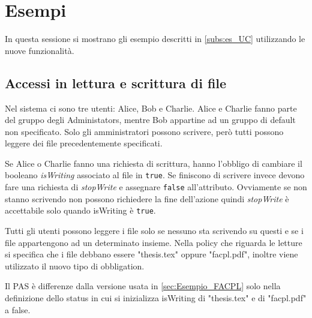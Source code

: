 \section{Esempi}
\label{sec:Esempi}
In questa sessione si mostrano gli esempio descritti in \ref{subs:es_UC} utilizzando le nuove funzionalità.
\subsection{Accessi in lettura e scrittura di file}
\label{sub:RW_Code_Sec}
Nel sistema ci sono tre utenti: Alice, Bob e Charlie. Alice e Charlie fanno parte del gruppo degli Administators,
mentre Bob appartine ad un gruppo di default non specificato. Solo gli amministratori possono scrivere,
però tutti possono leggere dei file precedentemente specificati.

Se Alice o Charlie fanno una richiesta di scrittura, hanno l'obbligo di cambiare il booleano \emph{isWriting} associato al file in \texttt{true}.
Se finiscono di scrivere invece devono fare una richiesta di \emph{stopWrite} e assegnare \texttt{false} all'attributo.
Ovviamente se non stanno scrivendo non possono richiedere la fine dell'azione quindi \emph{stopWrite} è accettabile solo quando
isWriting è \texttt{true}.

Tutti gli utenti possono leggere i file solo se nessuno sta scrivendo su questi e
se i file appartengono ad un determinato insieme. Nella policy che riguarda le letture si specifica che i
file debbano essere "thesis.tex" oppure "facpl.pdf", inoltre viene utilizzato il nuovo tipo di obbligation.

Il \ac{PAS} è differenze dalla versione usata in \ref{sec:Esempio_FACPL} solo nella definizione dello status
in cui si inizializza isWriting di "thesis.tex" e di "facpl.pdf" a false.

